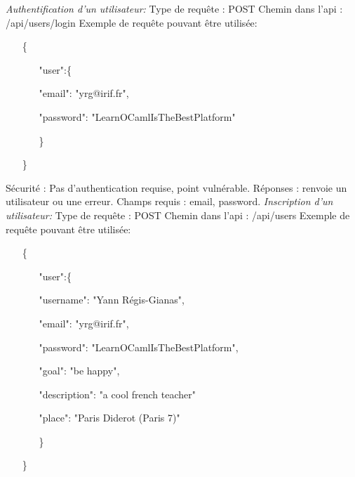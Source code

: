 \documentclass{article}
\begin{document}
\newline
\newline
\textit{Authentification d'un utilisateur:}
\newline
Type de requête : POST
\newline
Chemin dans l'api : /api/users/login
\newline
Exemple de requête pouvant être utilisée:
\begin{itemize}
\item[\{]
\begin{itemize}
	\item[]
	\item["user":\{]
	\item[]"email": "yrg@irif.fr",
	\item[]"password": "LearnOCamlIsTheBestPlatform"
	\item[\}]
\end{itemize}
\item[\}]
\end{itemize}
Sécurité : Pas d'authentication requise, point vulnérable.
\newline
Réponses : renvoie un utilisateur ou une erreur.
\newline
Champs requis : email, password.
\newline
\newline
\textit{Inscription d'un utilisateur:}
\newline
Type de requête : POST
\newline
Chemin dans l'api : /api/users
\newline
Exemple de requête pouvant être utilisée:
\begin{itemize}
	\item[\{]
	\begin{itemize}
		\item[]
		\item["user":\{]
		\item[]"username": "Yann Régis-Gianas",
		\item[]"email": "yrg@irif.fr",
		\item[]"password": "LearnOCamlIsTheBestPlatform",
		\item[]"goal": "be happy",
		\item[]"description": "a cool french teacher"
		\item[]"place": "Paris Diderot (Paris 7)"
		\item[\}]
	\end{itemize}
	\item[\}]
\end{itemize}
\end{document}
